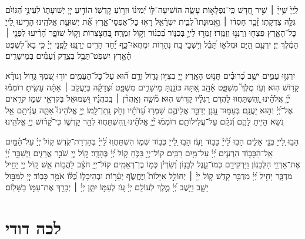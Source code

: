 \documentclass[twoside, openany, parskip=half, 11pt]{book}
\begin{document}
לַֽיְיָ֙ שִׁ֥ייָ֨ ׀ שִׁ֣יר חָ֭דָשׁ כִּֽי־נִפְלָא֣וֹת עָשָׂ֑ה הוֹשִׁיעָה־לּ֥וֹ יְ֝מִינ֗וֹ וּזְר֥וֹעַ קׇדְשֽׁוֹ׃
הוֹדִ֣יעַ יְיָ֭ יְשׁוּעָת֑וֹ לְעֵינֵ֥י הַ֝גּוֹיִ֗ם גִּלָּ֥ה צִדְקָתֽוֹ׃
זָ֘כַ֤ר חַסְדּ֨וֹ ׀ וֶ֥אֱֽמוּנָתוֹ֮ לְבֵ֢ית יִשְׂרָ֫אֵ֥ל רָא֥וּ כׇל־אַפְסֵי־אָ֑רֶץ אֵ֗֝ת יְשׁוּעַ֥ת אֱלֹהֵֽינוּ׃
הָרִ֣יעוּ לַ֭ייָ כׇּל־הָאָ֑רֶץ פִּצְח֖וּ וְרַנְּנ֣וּ וְזַמֵּֽרוּ׃
זַמְּר֣וּ לַייָ֣ בְּכִנּ֑וֹר בְּ֝כִנּ֗וֹר וְק֣וֹל זִמְרָֽה׃
בַּ֭חֲצֹ֣צְרוֹת וְק֣וֹל שׁוֹפָ֑ר הָ֝רִ֗יעוּ לִפְנֵ֤י ׀ הַמֶּ֬לֶךְ יְיָ׃
יִרְעַ֣ם הַ֭יָּם וּמְלֹא֑וֹ תֵּ֝בֵ֗ל וְיֹ֣שְׁבֵי בָֽהּ׃
נְהָר֥וֹת יִמְחֲאוּ־כָ֑ף יַ֗֝חַד הָרִ֥ים יְרַנֵּֽנוּ׃
לִ֥פְֽנֵי יְיָ֗ כִּ֥י בָא֮ לִשְׁפֹּ֢ט הָ֫אָ֥רֶץ יִשְׁפֹּֽט־תֵּבֵ֥ל בְּצֶ֑דֶק וְ֝עַמִּ֗ים בְּמֵישָׁרִֽים׃

יִרְגְּז֣וּ עַמִּ֑ים יֹשֵׁ֥ב כְּ֝רוּבִ֗ים תָּנ֥וּט הָאָֽרֶץ׃
יְיָ֭ בְּצִיּ֣וֹן גָּד֑וֹל וְרָ֥ם ה֗֝וּא עַל־כׇּל־הָעַמִּֽים׃
יוֹד֣וּ שִׁ֭מְךָ גָּד֥וֹל וְנוֹרָ֗א קָד֥וֹשׁ הֽוּא׃
וְעֹ֥ז מֶלֶךְ֮ מִשְׁפָּ֢ט אָ֫הֵ֥ב אַ֭תָּה כּוֹנַ֣נְתָּ מֵישָׁרִ֑ים מִשְׁפָּ֥ט וּ֝צְדָקָ֗ה בְּיַעֲקֹ֤ב ׀ אַתָּ֬ה עָשִֽׂיתָ׃
רוֹמְמ֡וּ יְ֘יָ֤ אֱלֹהֵ֗ינוּ וְֽ֭הִשְׁתַּחֲווּ לַהֲדֹ֥ם רַגְלָ֗יו קָד֥וֹשׁ הֽוּא׃
מֹ֘שֶׁ֤ה וְאַֽהֲרֹ֨ן ׀ בְּֽכֹהֲנָ֗יו וּ֭שְׁמוּאֵל בְּקֹרְאֵ֣י שְׁמ֑וֹ קֹרִ֥אים אֶל־יְ֝יָ֗ וְה֣וּא יַעֲנֵֽם׃
בְּעַמּ֣וּד עָ֭נָן יְדַבֵּ֣ר אֲלֵיהֶ֑ם שָׁמְר֥וּ עֵ֝דֹתָ֗יו וְחֹ֣ק נָֽתַן־לָֽמוֹ׃
יְיָ֣ אֱלֹהֵינוּ֮ אַתָּ֢ה עֲנִ֫יתָ֥ם אֵ֣ל נֹ֭שֵׂא הָיִ֣יתָ לָהֶ֑ם וְ֝נֹקֵ֗ם עַל־עֲלִילוֹתָֽם׃
רוֹמְמ֡וּ יְ֘יָ֤ אֱלֹהֵ֗ינוּ וְֽ֭הִשְׁתַּחֲווּ לְהַ֣ר קׇדְשׁ֑וֹ כִּי־קָ֝ד֗וֹשׁ יְיָ֥ אֱלֹהֵֽינוּ׃

הָב֣וּ לַ֭ייָ בְּנֵ֣י אֵלִ֑ים הָב֥וּ לַ֝ייָ֗ כָּב֥וֹד וָעֹֽז׃
הָב֣וּ לַ֭ייָ כְּב֣וֹד שְׁמ֑וֹ הִשְׁתַּחֲו֥וּ לַ֝ייָ֗ בְּהַדְרַת־קֹֽדֶשׁ׃
ק֥וֹל יְיָ֗ עַל־הַ֫מָּ֥יִם אֵֽל־הַכָּב֥וֹד הִרְעִ֑ים יְ֝יָ֗ עַל־מַ֥יִם רַבִּֽים׃
קוֹל־יְיָ֥ בַּכֹּ֑חַ ק֥וֹל יְ֝יָ֗ בֶּהָדָֽר׃
ק֣וֹל יְיָ֭ שֹׁבֵ֣ר אֲרָזִ֑ים וַיְשַׁבֵּ֥ר יְ֝יָ֗ אֶת־אַרְזֵ֥י הַלְּבָנֽוֹן׃
וַיַּרְקִידֵ֥ם כְּמוֹ־עֵ֑גֶל לְבָנ֥וֹן וְ֝שִׂרְיֹ֗ן כְּמ֣וֹ בֶן־רְאֵמִֽים׃
קוֹל־יְיָ֥ חֹצֵ֗ב לַהֲב֥וֹת אֵֽשׁ׃
ק֣וֹל יְיָ֭ יָחִ֣יל מִדְבָּ֑ר יָחִ֥יל יְ֝יָ֗ מִדְבַּ֥ר קָדֵֽשׁ׃
ק֤וֹל יְיָ֨ ׀ יְחוֹלֵ֣ל אַיָּלוֹת֮ וַֽיֶּחֱשֹׂ֢ף יְעָ֫ר֥וֹת וּבְהֵיכָל֑וֹ כֻּ֝לּ֗וֹ אֹמֵ֥ר כָּבֽוֹד׃
יְיָ֭ לַמַּבּ֣וּל יָשָׁ֑ב וַיֵּ֥שֶׁב יְ֝יָ֗ מֶ֣לֶךְ לְעוֹלָֽם׃
יְיָ֗ עֹ֭ז לְעַמּ֣וֹ יִתֵּ֑ן יְיָ֓ ׀ יְבָרֵ֖ךְ אֶת־עַמּ֣וֹ בַשָּׁלֽוֹם׃


\section[לכה דודי]{ לכה דודי }
\end{document}
